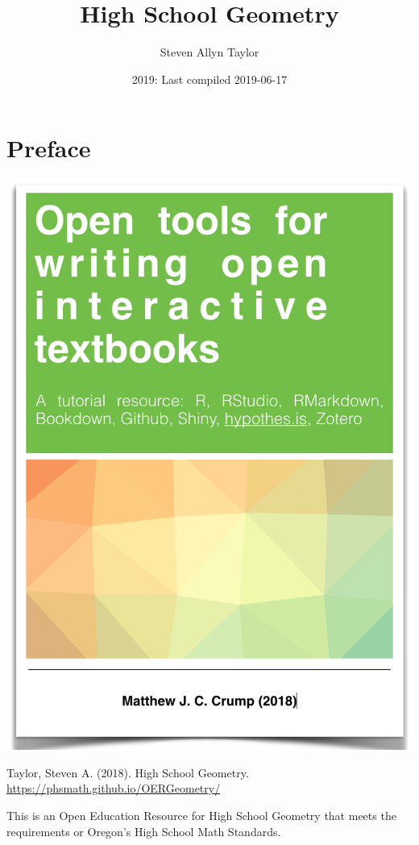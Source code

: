 \documentclass[]{book}
\title{High School Geometry}
\author{Steven Allyn Taylor}
\date{2019: Last compiled 2019-06-17}
\begin{document}
\maketitle

{
\setcounter{tocdepth}{1}
\tableofcontents
}
\chapter*{Preface}\label{preface}

\begin{center}\includegraphics{OER} \end{center}

Taylor, Steven A. (2018). High School Geometry.
\url{https://phsmath.github.io/OERGeometry/}

This is an Open Education Resource for High School Geometry that meets
the requirements or Oregon's High School Math Standards.
\end{document}
